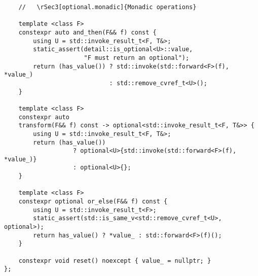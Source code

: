 \documentclass[a4paper,10pt,oneside,openany,final,article]{memoir}
\begin{document}
\begin{verbatim}
    //   \rSec3[optional.monadic]{Monadic operations}

    template <class F>
    constexpr auto and_then(F&& f) const {
        using U = std::invoke_result_t<F, T&>;
        static_assert(detail::is_optional<U>::value,
                      "F must return an optional");
        return (has_value()) ? std::invoke(std::forward<F>(f), *value_)
                             : std::remove_cvref_t<U>();
    }

    template <class F>
    constexpr auto
    transform(F&& f) const -> optional<std::invoke_result_t<F, T&>> {
        using U = std::invoke_result_t<F, T&>;
        return (has_value())
                   ? optional<U>{std::invoke(std::forward<F>(f), *value_)}
                   : optional<U>{};
    }

    template <class F>
    constexpr optional or_else(F&& f) const {
        using U = std::invoke_result_t<F>;
        static_assert(std::is_same_v<std::remove_cvref_t<U>, optional>);
        return has_value() ? *value_ : std::forward<F>(f)();
    }

    constexpr void reset() noexcept { value_ = nullptr; }
};
\end{verbatim}
\end{document}
